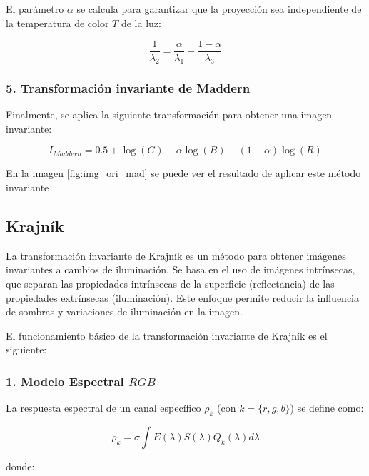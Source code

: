 El parámetro $\alpha$ se calcula para garantizar que la proyección sea independiente de la temperatura de color $T$ de la luz:

$$\frac{1}{\lambda_2 }=\frac{\alpha }{\lambda_1 }+\frac{1-\alpha }{\lambda_3 }$$

\subsubsection{5. Transformación invariante de Maddern}

Finalmente, se aplica la siguiente transformación para obtener una imagen invariante:

$$I_{Maddern} =0.5+\log (G)-\alpha \log (B)-(1-\alpha )\log (R)$$

En la imagen \ref{fig:img_ori_mad} se puede ver el resultado de aplicar este método invariante

\subsection{Krajník}\label{krajník}

La transformación invariante de Krajník \cite{krajník2015} es un método para obtener imágenes invariantes a cambios de iluminación. Se basa en el uso de imágenes intrínsecas, que separan las propiedades intrínsecas de la superficie (reflectancia) de las propiedades extrínsecas (iluminación). Este enfoque permite reducir la influencia de sombras y variaciones de iluminación en la imagen.

El funcionamiento básico de la transformación invariante de Krajník es el siguiente:

\subsubsection{1. Modelo Espectral $RGB$}

La respuesta espectral de un canal específico $\rho_k$ (con $k=\lbrace r,g,b\rbrace$) se define como:

$$\rho_k =\sigma \int E(\lambda )S(\lambda )Q_k (\lambda )d\lambda$$

donde:

